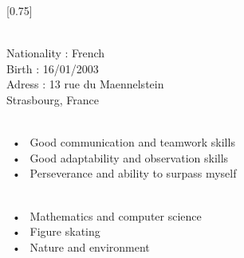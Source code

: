 \documentclass[lighthipster]{latex_for_CV/simplehipstercv}
\begin{document}
\setlength{\columnsep}{1.5cm}
[0.75]
\begin{paracol}{2}

\paracolbackgroundoptions



\footnotesize
{\setasidefontcolour
\flushright
\begin{center}
\end{center}

\bigskip


 \\[0.5em]
Nationality : French  \\
Birth : 16/01/2003 \\
Adress : 13 rue du Maennelstein \\ Strasbourg, France


\bigskip
\bigskip
\bigskip


 \\[0.5em]

~•~ Good communication and teamwork skills \\
~•~ Good adaptability and observation skills \\
~•~ Perseverance and ability to surpass myself

\bigskip
\bigskip
\bigskip


\\[0.5em]

~•~ Mathematics and computer science \\
~•~ Figure skating \\
~•~ Nature and environment \\

\bigskip

\vspace{4em}



\phantom{turn the page}

\phantom{turn the page}
}
\switchcolumn


\end{paracol}
\end{document}
